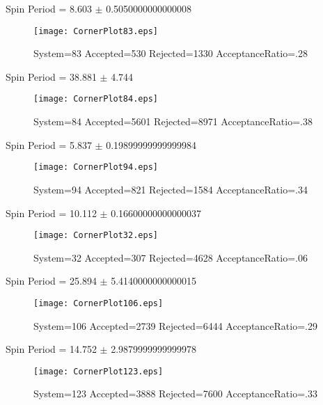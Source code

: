 \documentclass[10pt]{article}
\begin{document}
\newpage
\begin{center}
        Spin Period = 8.603 $\pm$ 0.5050000000000008
        \end{center}
\begin{figure}[H] 
        \texttt{[image: CornerPlot83.eps]}
        \caption{System=83 Accepted=530 Rejected=1330 AcceptanceRatio=.28}
        \label{S83}
        \centering
        \end{figure}
\newpage
\begin{center}
        Spin Period = 38.881 $\pm$ 4.744
        \end{center}
\begin{figure}[H] 
        \texttt{[image: CornerPlot84.eps]}
        \caption{System=84 Accepted=5601 Rejected=8971 AcceptanceRatio=.38}
        \label{S84}
        \centering
        \end{figure}
\newpage
\begin{center}
        Spin Period = 5.837 $\pm$ 0.19899999999999984
        \end{center}
\begin{figure}[H] 
        \texttt{[image: CornerPlot94.eps]}
        \caption{System=94 Accepted=821 Rejected=1584 AcceptanceRatio=.34}
        \label{S94}
        \centering
        \end{figure}
\newpage
\begin{center}
        Spin Period = 10.112 $\pm$ 0.16600000000000037
        \end{center}
\begin{figure}[H] 
        \texttt{[image: CornerPlot32.eps]}
        \caption{System=32 Accepted=307 Rejected=4628 AcceptanceRatio=.06}
        \label{S32}
        \centering
        \end{figure}
\newpage
\begin{center}
        Spin Period = 25.894 $\pm$ 5.4140000000000015
        \end{center}
\begin{figure}[H] 
        \texttt{[image: CornerPlot106.eps]}
        \caption{System=106 Accepted=2739 Rejected=6444 AcceptanceRatio=.29}
        \label{S106}
        \centering
        \end{figure}
\newpage
\begin{center}
        Spin Period = 14.752 $\pm$ 2.9879999999999978
        \end{center}
\begin{figure}[H] 
        \texttt{[image: CornerPlot123.eps]}
        \caption{System=123 Accepted=3888 Rejected=7600 AcceptanceRatio=.33}
        \label{S123}
        \centering
        \end{figure}
\end{document}
